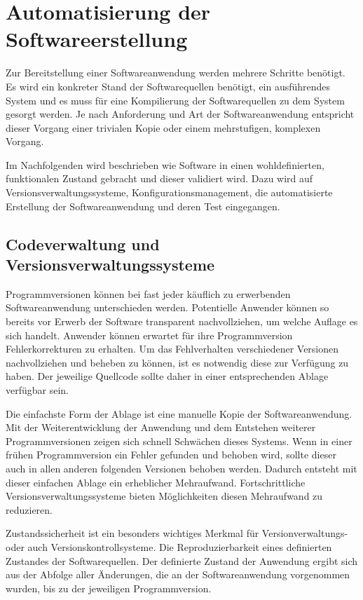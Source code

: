 \section{Automatisierung der Softwareerstellung}
\label{sec:automation-software}

Zur Bereitstellung einer Softwareanwendung werden mehrere Schritte benötigt. Es wird ein konkreter Stand der Softwarequellen benötigt, ein ausführendes System und es muss für eine Kompilierung der Softwarequellen zu dem System gesorgt werden.
Je nach Anforderung und Art der Softwareanwendung entspricht dieser Vorgang einer trivialen Kopie oder einem mehrstufigen, komplexen Vorgang. 

Im Nachfolgenden wird beschrieben wie Software in einen wohldefinierten, funktionalen Zustand gebracht und dieser validiert wird. Dazu wird auf Versionsverwaltungssysteme, Konfigurationsmanagement, die automatisierte Erstellung der Softwareanwendung und deren Test eingegangen.

\subsection{Codeverwaltung und Versionsverwaltungssysteme}

Programmversionen können bei fast jeder käuflich zu erwerbenden Softwareanwendung unterschieden werden. Potentielle 
Anwender können so bereits vor Erwerb der Software transparent nachvollziehen, um welche Auflage es sich handelt. Anwender können erwartet für ihre Programmversion Fehlerkorrekturen zu erhalten. Um das Fehlverhalten verschiedener Versionen nachvollziehen und beheben zu können, ist es notwendig diese zur Verfügung zu haben. Der jeweilige Quellcode sollte daher in einer entsprechenden Ablage verfügbar sein.

Die einfachste Form der Ablage ist eine manuelle Kopie der Softwareanwendung. Mit der Weiterentwicklung der Anwendung und 
dem Entstehen weiterer Programmversionen zeigen sich schnell Schwächen dieses Systems. Wenn in einer frühen 
Programmversion ein Fehler gefunden und behoben wird, sollte dieser auch in allen anderen folgenden Versionen behoben 
werden. Dadurch entsteht mit dieser einfachen Ablage ein erheblicher Mehraufwand. Fortschrittliche 
Versionsverwaltungssysteme bieten Möglichkeiten diesen Mehraufwand zu reduzieren.

Zustandssicherheit ist ein besonders wichtiges Merkmal für Versionverwaltungs- oder auch Versionskontrollsysteme.
Die Reproduzierbarkeit eines definierten Zustandes der Softwarequellen. Der definierte Zustand der Anwendung ergibt sich 
aus der Abfolge aller Änderungen, die an der Softwareanwendung vorgenommen wurden, bis zu der jeweiligen Programmversion. 

